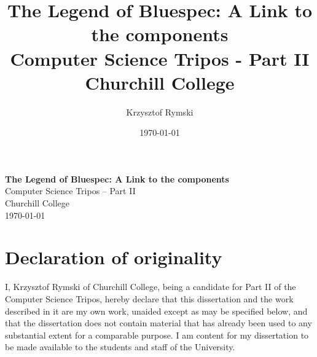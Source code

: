 \documentclass[12pt]{report}
\title{The Legend of Bluespec: A Link to the components \\
\large Computer Science Tripos - Part II \\
Churchill College}
\date{\today}
\author{Krzysztof Rymski}
\begin{document}


\pagestyle{empty}


\vspace*{60mm}
\begin{center}
\Huge
\textbf{The Legend of Bluespec: A Link to the components} \\[5mm]
Computer Science Tripos -- Part II \\[5mm]
Churchill College \\[5mm]
\today  %
\end{center}

\newpage
\section*{Declaration of originality}

I, Krzysztof Rymski of Churchill College, being a candidate for Part II of the Computer Science Tripos, hereby declare that this dissertation and the work described in it are my own work, unaided except as may be specified below, and that the dissertation does not contain material that has already been used to any substantial extent for a comparable purpose. I am content for my dissertation to be made available to the students and staff of the University.

\bigskip
{}

\medskip
{}


\newpage
\end{document}
